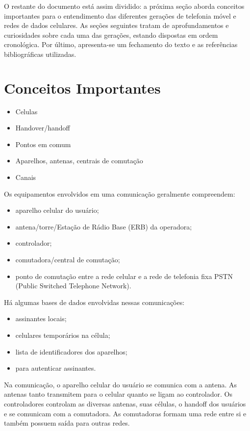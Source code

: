 \documentclass[11pt,oneside,a4paper]{abntex2}
\begin{document}
O restante do documento está assim dividido: a próxima seção aborda conceitos importantes para o entendimento das diferentes gerações de telefonia móvel e redes de dados celulares. As seções seguintes tratam de aprofundamentos e curiosidades sobre cada uma das gerações, estando dispostas em ordem cronológica. Por último, apresenta-se um fechamento do texto e as referências bibliográficas utilizadas.

\section*{Conceitos Importantes}
\label{conceitos}

\begin{itemize}
	\item Celulas
	\item Handover/handoff
	\item Pontos em comum
	\item Aparelhos, antenas, centrais de comutação
	\item Canais
\end{itemize}

Os equipamentos envolvidos em uma comunicação geralmente compreendem:
\begin{itemize}
	\item aparelho celular do usuário;
	\item antena/torre/Estação de Rádio Base (ERB) da operadora;
	\item controlador;
	\item comutadora/central de comutação;
	\item ponto de comutação entre a rede celular e a rede de telefonia fixa PSTN (Public Switched Telephone Network).
\end{itemize}

Há algumas bases de dados envolvidas nessas comunicações:
\begin{itemize}
	\item assinantes locais;
	\item celulares temporários na célula;
	\item lista de identificadores dos aparelhos;
	\item para autenticar assinantes.
\end{itemize}

Na comunicação, o aparelho celular do usuário se comunica com a antena. As antenas tanto transmitem para o celular quanto se ligam ao controlador. Os controladores controlam as diversas antenas, suas células, o handoff dos usuários e se comunicam com a comutadora. As comutadoras formam uma rede entre si e também possuem saída para outras redes.
\end{document}
